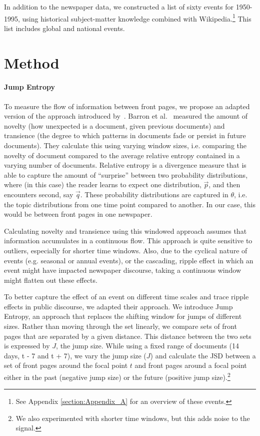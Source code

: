 \documentclass[]{ceurart}
\begin{document}
In addition to the newspaper data, we constructed a list of sixty events for 1950-1995, using historical subject-matter knowledge combined with Wikipedia.\footnote{See Appendix \ref{section:Appendix_A} for an overview of these events.} This list includes global and national events. 

\section*{Method}

\paragraph{Jump Entropy} To measure the flow of information between front pages, we propose an adapted version of the approach introduced by~\cite{barron_individuals_2018}. Barron et al.~\cite{barron_individuals_2018} measured the amount of novelty (how unexpected is a document, given previous documents) and transience (the degree to which patterns in documents fade or persist in future documents). They calculate this using varying window sizes, i.e. comparing the novelty of document compared to the average relative entropy contained in a varying number of documents. Relative entropy is a divergence measure that is able to capture the amount of ``surprise'' between two probability distributions, where (in this case) the reader learns to expect one distribution, $\vec{p}$, and then encounters second, say $\vec{q}$. These probability distributions are captured in $\theta$, i.e. the topic distributions from one time point compared to another. In our case, this would be between front pages in one newspaper. 

Calculating novelty and transience using this windowed approach assumes that information accumulates in a continuous flow. This approach is quite sensitive to outliers, especially for shorter time windows. Also, due to the cyclical nature of events (e.g. seasonal or annual events), or the cascading, ripple effect in which an event might have impacted newspaper discourse, taking a continuous window might flatten out these effects. 

To better capture the effect of an event on different time scales and trace ripple effects in public discourse, we adapted their approach. We introduce Jump Entropy, an approach that replaces the shifting window for jumps of different sizes. Rather than moving through the set linearly, we compare sets of front pages that are separated by a given distance. This distance between the two sets is expressed by $J$, the jump size. While using a fixed range of documents (14 days, t - 7 and t + 7), we vary the jump size ($J$) and calculate the JSD between a set of front pages around the focal point $t$ and front pages around a focal point either in the past (negative jump size) or the future (positive jump size).\footnote{We also experimented with shorter time windows, but this adds noise to the signal.} 
\end{document}
